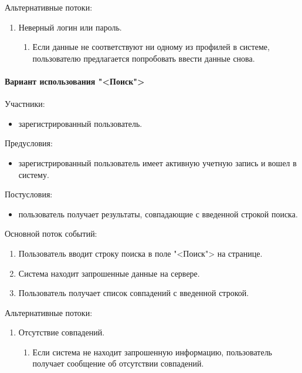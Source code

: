 Альтернативные потоки:
\begin{enumerate}
	\item Неверный логин или пароль.
	\begin{enumerate}
		\item Если данные не соответствуют ни одному из профилей в системе, пользователю предлагается попробовать ввести данные снова.
	\end{enumerate}
\end{enumerate}

\paragraph{Вариант использования "<Поиск">}

Участники:
\begin{itemize}
	\item зарегистрированный пользователь.
\end{itemize}

Предусловия:
\begin{itemize}
	\item зарегистрированный пользователь имеет активную учетную запись и вошел в систему.
\end{itemize}

Постусловия:
\begin{itemize}
	\item пользователь получает результаты, совпадающие с введенной строкой поиска.
\end{itemize}

Основной поток событий:
\begin{enumerate}
	\item Пользователь вводит строку поиска в поле "<Поиск"> на странице.
	\item Система находит запрошенные данные на сервере.
	\item Пользователь получает список совпадений с введенной строкой.
\end{enumerate}

Альтернативные потоки:
\begin{enumerate}
	\item Отсутствие совпадений.
	\begin{enumerate}
		\item Если система не находит запрошенную информацию, пользователь получает сообщение об отсутствии совпадений.
	\end{enumerate}
\end{enumerate}

